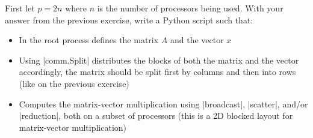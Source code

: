\documentclass[11pt]{article}
\begin{document}
First let $p = 2n$ where $n$ is the number of processors being used. With your answer from the previous exercise, write a Python script such that:

\begin{itemize}
   \item In the root process defines the matrix $A$ and the vector $x$
   \item Using |comm.Split| distributes the blocks of both the matrix and the vector accordingly, the matrix should be split first by columns and then into rows (like on the previous exercise)
   \item Computes the matrix-vector multiplication using |broadcast|, |scatter|, and/or |reduction|, both on a subset of processors (this is a 2D blocked layout for matrix-vector multiplication)
\end{itemize}
\end{document}

